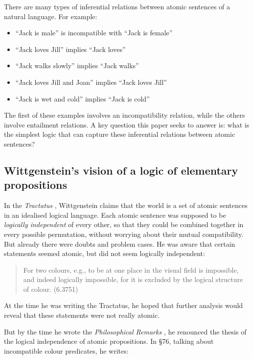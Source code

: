 There are many types of inferential relations between atomic
sentences of a natural language.  For example:

\begin{itemize}

\item ``Jack is male'' is incompatible with ``Jack is female''
\item ``Jack loves Jill'' implies ``Jack loves''
\item ``Jack walks slowly'' implies ``Jack walks''
\item ``Jack loves Jill and Joan'' implies ``Jack loves Jill''
\item ``Jack is wet and cold'' implies ``Jack is cold''

\end{itemize}

\NI The first of these examples involves an incompatibility relation,
while the others involve entailment relations.  A key question this
paper seeks to answer is: what is the simplest logic that can capture
these inferential relations between atomic sentences?

\subsection{Wittgenstein's vision of a logic of elementary propositions}

\NI In the \emph{Tractatus} \cite{wittgenstein-tractatus}, Wittgenstein
claims that the world is a set of atomic sentences in an idealised
logical language.  Each atomic sentence was supposed to be
\emph{logically independent} of every other, so that they could be
combined together in every possible permutation, without worrying
about their mutual compatibility.
But already there were doubts and problem cases.  He was aware that
certain  statements seemed atomic, but did not seem logically
independent:

\begin{quote}
  For two colours, e.g., to be at one place in the visual field is
  impossible, and indeed logically impossible, for it is excluded by
  the logical structure of colour. (6.3751)
\end{quote}

\NI At the time he was writing the Tractatus, he hoped that further
analysis would reveal that these statements were not really atomic.

But by the time he wrote the \emph{Philosophical Remarks} \cite{wittgenstein-remarks}, he
renounced the thesis of the logical independence of atomic
propositions.  In \S 76, talking about incompatible colour predicates,
he writes:

